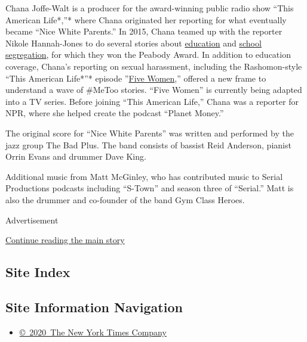 Chana Joffe-Walt is a producer for the award-winning public radio show
``This American Life*,''* where Chana originated her reporting for what
eventually became ``Nice White Parents.'' In 2015, Chana teamed up with
the reporter Nikole Hannah-Jones to do several stories about
\href{https://www.thisamericanlife.org/550/three-miles}{education} and
\href{https://www.thisamericanlife.org/562/the-problem-we-all-live-with-part-one}{school
segregation}, for which they won the Peabody Award. In addition to
education coverage, Chana's reporting on sexual harassment, including
the Rashomon-style ``This American Life*''* episode
''\href{https://www.thisamericanlife.org/640/five-women}{Five Women},''
offered a new frame to understand a wave of \#MeToo stories. ``Five
Women'' is currently being adapted into a TV series. Before joining
``This American Life,'' Chana was a reporter for NPR, where she helped
create the podcast ``Planet Money.''

The original score for ``Nice White Parents'' was written and performed
by the jazz group The Bad Plus. The band consists of bassist Reid
Anderson, pianist Orrin Evans and drummer Dave King.

Additional music from Matt McGinley, who has contributed music to Serial
Productions podcasts including ``S-Town'' and season three of
``Serial.'' Matt is also the drummer and co-founder of the band Gym
Class Heroes.

Advertisement

\protect\hyperlink{after-bottom}{Continue reading the main story}

\hypertarget{site-index}{%
\subsection{Site Index}\label{site-index}}

\hypertarget{site-information-navigation}{%
\subsection{Site Information
Navigation}\label{site-information-navigation}}

\begin{itemize}
\tightlist
\item
  \href{https://help.nytimes.com/hc/en-us/articles/115014792127-Copyright-notice}{©~2020~The
  New York Times Company}
\end{itemize}

